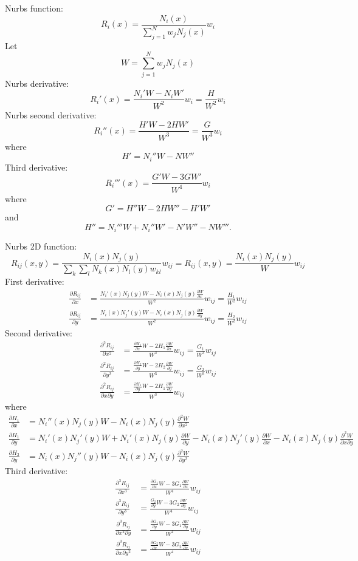 \documentclass[twoside, 11pt, a4paper]{article}
\begin{document}
Nurbs function:
\[
  R_i(x) = \frac{N_i(x)}{\sum_{j=1}^N w_jN_j(x)}w_i
\]
Let
\[
  W = \sum_{j=1}^Nw_jN_j(x)
\]
Nurbs derivative:
\[
  R_i'(x) = \frac{N_i'W - N_iW'}{W^2}w_i = \frac{H}{W^2}w_i
\]
Nurbs second derivative:
\[
  R_i''(x) = \frac{H'W - 2HW'}{W^3} = \frac{G}{W^3}w_i
\]
where
\[
  H' = N_i''W - NW''
\]
Third derivative:
\[
  R_i'''(x) = \frac{G'W - 3GW'}{W^4}w_i
\]
where
\[
  G' = H''W - 2HW'' - H'W'
\]
and
\[
  H'' = N_i'''W + N_i''W' - N'W'' -NW'''.
\]

\newpage
Nurbs 2D function:
\[
  R_{ij}(x,y) = \frac{N_i(x)N_j(y)}{\sum_k\sum_l N_k(x)N_l(y)w_{kl}}w_{ij} = R_{ij}(x,y) = \frac{N_i(x)N_j(y)}{W}w_{ij}
\]
First derivative:
\[
  \begin{split}
    \frac{\partial R_{ij}}{\partial x} &= \frac{N_i'(x)N_j(y)W - N_i(x)N_j(y)\frac{\partial W}{\partial x}}{W^2}w_{ij}  = \frac{H_1}{W^2}w_{ij}\\
    \frac{\partial R_{ij}}{\partial y} &= \frac{N_i(x)N_j'(y)W - N_i(x)N_j(y)\frac{\partial W}{\partial y}}{W^2}w_{ij} = \frac{H_2}{W^2}w_{ij}
  \end{split}
\]
Second derivative:
\[
  \begin{split}
    \frac{\partial^2 R_{ij}}{\partial x^2} &= \frac{\frac{\partial H_1}{\partial x}W - 2H_1\frac{\partial W}{\partial x}}{W^3}w_{ij} = \frac{G_1}{W^3}w_{ij} \\
    \frac{\partial^2 R_{ij}}{\partial y^2} &= \frac{\frac{\partial H_2}{\partial y}W - 2H_2\frac{\partial W}{\partial y}}{W^3}w_{ij} = \frac{G_2}{W^3}w_{ij} \\
    \frac{\partial^2 R_{ij}}{\partial x\partial y} &= \frac{\frac{\partial H_1}{\partial y}W - 2H_1\frac{\partial W}{\partial y}}{W^3}w_{ij}
  \end{split}
\]
where
\[
  \begin{split}
    \frac{\partial H_1}{\partial x} &= N_i''(x)N_j(y)W - N_i(x)N_j(y)\frac{\partial^2W}{\partial x^2} \\
    \frac{\partial H_1}{\partial y} &= N_i'(x)N_j'(y)W + N_i'(x)N_j(y)\frac{\partial W}{\partial y} - N_i(x)N_j'(y)\frac{\partial W}{\partial x} - N_i(x)N_j(y)\frac{\partial^2W}{\partial x\partial y} \\
    \frac{\partial H_2}{\partial y} &= N_i(x)N_j''(y)W - N_i(x)N_j(y)\frac{\partial^2W}{\partial y^2}
  \end{split}
\]
\newpage
Third derivative:
\[
  \begin{split}
    \frac{\partial^3 R_{ij}}{\partial x^3} &= \frac{\frac{\partial G_1}{\partial x}W - 3G_1\frac{\partial W}{\partial x}}{W^4}w_{ij} \\
    \frac{\partial^3 R_{ij}}{\partial y^3} &= \frac{\frac{G_2}{\partial y}W - 3G_2\frac{\partial W}{\partial y}}{W^4}w_{ij} \\
    \frac{\partial^3 R_{ij}}{\partial x^2\partial y} &= \frac{\frac{\partial G_1}{\partial y}W - 3G_1\frac{\partial W}{\partial y}}{W^4}w_{ij} \\
    \frac{\partial^3 R_{ij}}{\partial x\partial y^2} &= \frac{\frac{\partial G_2}{\partial x}W - 3G_2\frac{\partial W}{\partial x}}{W^4}w_{ij}
  \end{split}
\]
\end{document}
